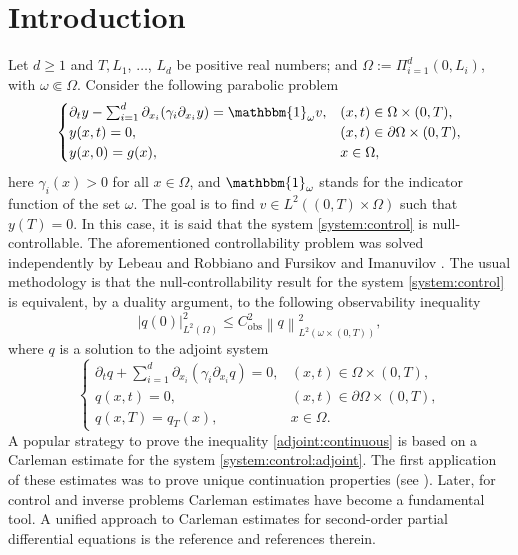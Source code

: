 \documentclass[11pt,oneside,leqno]{amsart}
\numberwithin{equation}{section}
\numberwithin{equation}{section}
\begin{document}
\section{Introduction}
 Let $d\geq 1$ and $T,L_{1}$, $\ldots$,  $L_{d}$ be positive real numbers; and $\Omega:=\Pi_{i=1}^{d}(0,L_{i})$, with $\omega\Subset \Omega$. Consider the following parabolic problem
\begin{equation}\label{system:control}
\begin{cases}
\partial_{t} y - \sum_{i=1}^{d}\partial_{x_{i}}( \gamma_{i}\partial_{x_{i}}y)  = \mathbbm{1}_\omega v, & (x,t) \in \Omega \times (0,T),\\
y(x,t) = 0, & (x,t) \in \partial\Omega \times (0,T),\\
y(x,0) = g(x), & x \in \Omega,
\end{cases}
\end{equation}
here $\gamma_{i}(x)>0$ for all $x\in\Omega$, and $\mathbbm{1}_\omega$ stands for the indicator function of the set $\omega$. The goal is to find $v\in L^{2}((0,T)\times\Omega)$ such that $y(T)=0$. In this case, it is said that the system \eqref{system:control} is null-controllable. The aforementioned controllability problem was solved independently by Lebeau and Robbiano \cite{lebeau1995controle} and Fursikov and Imanuvilov \cite{fursikov-1996}. The usual methodology is that the null-controllability result for the system \eqref{system:control} is equivalent, by a duality argument, to the following observability inequality
\begin{equation}\label{adjoint:continuous}
    |q(0)|^{2}_{L^{2}(\Omega)}\leq C_{\text{obs}}^{2}\left\| q\right\|^{2}_{L^{2}(\omega\times(0,T))},
\end{equation}
where $q$ is a solution to the adjoint system
\begin{equation}\label{system:control:adjoint}
\begin{cases}
\partial_{t} q + \sum_{i=1}^{d}\partial_{x_{i}}( \gamma_{i}\partial_{x_{i}}q)  = 0, & (x,t) \in \Omega \times (0,T),\\
q(x,t) = 0, & (x,t) \in \partial\Omega \times (0,T),\\
q(x,T)=q_{T}(x),&x\in \Omega.
\end{cases}
\end{equation}
A popular strategy to prove the inequality \eqref{adjoint:continuous} is based on a Carleman estimate for the system \eqref{system:control:adjoint}. The first application of these estimates was to prove unique continuation properties (see \cite{carleman1939}). Later, for control and inverse problems Carleman estimates have become a fundamental tool. A unified approach to Carleman estimates for second-order partial differential equations is the reference \cite{fu-2019} and references therein.
\end{document}
